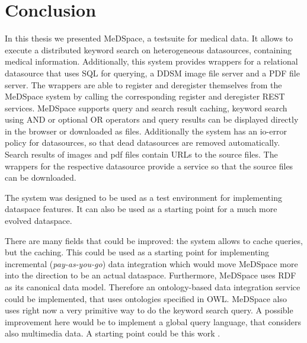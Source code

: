 \chapter{Conclusion}

In this thesis we presented MeDSpace, a testsuite for medical data. It allows to execute a distributed keyword search on heterogeneous datasources, containing medical information. 
Additionally, this system provides wrappers for a relational datasource that uses SQL for querying, a DDSM image file server and a PDF file server. The wrappers are able to register and deregister themselves from the MeDSpace system by calling the corresponding register and deregister REST services. MeDSpace supports query and search result caching, keyword search using AND or optional OR operators and query results can be displayed directly in the browser or downloaded as files. Additionally the system has an io-error policy for datasources, so that dead datasources are removed automatically. Search results of images and pdf files contain URLs to the source files. The wrappers for the respective datasource provide a service so that the source files can be downloaded.

The system was designed to be used as a test environment for implementing dataspace features. It can also be used as a starting point for a much more evolved dataspace.

There are many fields that could be improved: the system allows to cache queries, but the caching. This could be used as a starting point for implementing incremental (\emph{pay-as-you-go}) data integration which would move MeDSpace more into the direction to be an actual dataspace. Furthermore, MeDSpace uses RDF as its canonical data model. Therefore an ontology-based data integration service could be implemented, that uses ontologies specified in OWL. MeDSpace also uses right now a very primitive way to do the keyword search query. A possible improvement here would be to implement a global query language, that considers also multimedia data. A starting point could be this work \cite{6214725}.